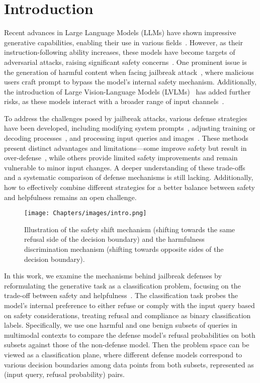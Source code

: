 \section{Introduction}
Recent advances in Large Language Models (LLMs) have shown impressive generative capabilities, enabling their use in various fields~\cite{gupta2023chatgpt, openai2023gpt, dubey2024llama}. However, as their instruction-following ability increases, these models have become targets of adversarial attacks, raising significant safety concerns~\cite{bommasani2021opportunities}.
One prominent issue is the generation of harmful content when facing jailbreak attack~\cite{huang2023catastrophic,liu2023jailbreaking}, where malicious users craft prompt to bypass the model's internal safety mechanism. 
Additionally, the introduction of Large Vision-Language Models (LVLMs)~\cite{bai2023qwen, liu2023visual, li2023blip} has added further risks, as these models interact with a broader range of input channels~\cite{gu2024agent, wang2024llms}.  


To address the challenges posed by jailbreak attacks, various defense strategies have been developed, including modifying system prompts~\cite{zhang2023defending, xie2023defending}, adjusting training or decoding processes~\cite{qi2023fine, xu2024safedecoding}, and processing input queries and images~\cite{zhang2023mutation, ji2024defending, wang2024defending}. These methods present distinct advantages and limitations—some improve safety but result in over-defense~\cite{jiang2024wildteaming}, while others provide limited safety improvements and remain vulnerable to minor input changes. A deeper understanding of these trade-offs and a systematic comparison of defense mechanisms is still lacking. Additionally, how to effectively combine different strategies for a better balance between safety and helpfulness remains an open challenge.  

\begin{figure*}[!ht]
    \centering
    \texttt{[image: Chapters/images/intro.png]}
    \caption{Illustration of the safety shift mechanism (shifting towards the same refusal side of the decision boundary) and the harmfulness discrimination mechanism (shifting towards opposite sides of the decision boundary).}
    \label{fig:intro}
\end{figure*}

In this work, we examine the mechanisms behind jailbreak defenses by reformulating the generative task as a classification problem, focusing on the trade-off between safety and helpfulness~\cite{wei2024jailbroken, mkadry2017towards}. The classification task probes the model's internal preference to either refuse or comply with the input query based on safety considerations, treating refusal and compliance as binary classification labels. Specifically, we use one harmful and one benign subsets of queries in multimodal contexts to compare the defense model's refusal probabilities on both subsets against those of the non-defense model. Then the problem space can be viewed as a classification plane, where different defense models correspond to various decision boundaries among data points from both subsets, represented as (input query, refusal probability) pairs.


